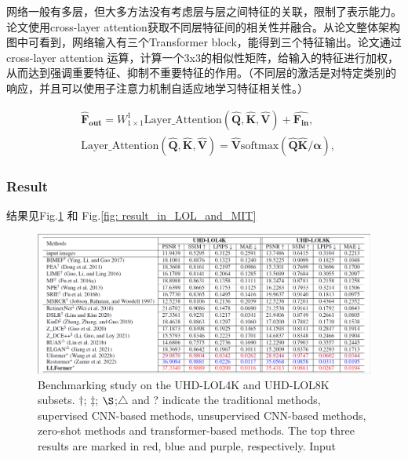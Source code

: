 \documentclass[letterpaper,10pt]{article}
\begin{document}
	 网络一般有多层，但大多方法没有考虑层与层之间特征的关联，限制了表示能力。论文使用cross-layer attention获取不同层特征间的相关性并融合。从论文整体架构图中可看到，网络输入有三个Transformer block，能得到三个特征输出。论文通过cross-layer attention 运算，计算一个3x3的相似性矩阵，给输入的特征进行加权，从而达到强调重要特征、抑制不重要特征的作用。（不同层的激活是对特定类别的响应，并且可以使用子注意力机制自适应地学习特征相关性。）
	
	\begin{equation}
		\begin{aligned}
			& \hat{\mathbf{F}}_{\mathbf{out}} = W_{1\times1}^1 \text{Layer\_Attention}(\hat{\mathbf{Q}}, \hat{\mathbf{K}}, \hat{\mathbf{V}}) + \hat{\mathbf{F}_{\mathbf{in}}},\\ 
			& \text{Layer\_Attention}(\hat{\mathbf{Q}}, \hat{\mathbf{K}}, \hat{\mathbf{V}}) = \hat{\mathbf{V}}\text{softmax}\left(\hat{\mathbf{Q}}\hat{\mathbf{K}}/\mathbf{\alpha}\right), 
		\end{aligned}
		\label{eq: DGFN}
	\end{equation}
	
	\subsubsection{Result}
	
	结果见Fig.\ref{fig: result_in_UHD-LOL} 和 Fig.\ref{fig: result_in_LOL_and_MIT}
	
	\begin{figure}[htbp]
		\centering 
		\includegraphics[width=\columnwidth]{picture/Results_on_UHD-LOL}
		\captionsetup{font=scriptsize}
		\caption{
			\label{fig: result_in_UHD-LOL} %
			Benchmarking study on the UHD-LOL4K and UHD-LOL8K subsets. $\dag$; $\ddag$; $\S$;$\triangle$ and ? indicate the traditional methods, supervised CNN-based methods, unsupervised CNN-based methods, zero-shot methods and transformer-based methods. The top three results are marked in red, blue and purple, respectively.
			Input
		}
	\end{figure}
	
\end{document}
